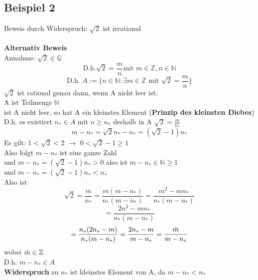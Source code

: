 \documentclass{article}
\begin{document}
        \subsection{Beispiel 2}
        Beweis durch Widerspruch: $\sqrt{2}$ ist irrational\\\\
        \textbf{Alternativ Beweis}\\
            Annahme: $\sqrt{2}\in \mathbb{Q}$\\
            $$\text{D.h.} \sqrt{2}=\frac{m}{n} \text{mit }m \in \mathbb{Z}, n\in \mathbb{N}$$
            $$\text{D.h. } A:= \{ n\in \mathbb{N} : \exists m \in \mathbb{Z} \text{ mit } \sqrt{2}=\frac{m}{n}\}$$
            $\sqrt{2}$ ist rational genau dann, wenn A  nicht leer ist.\\
            A ist Teilmenge $\mathbb{N}$\\
            ist A nicht leer, so hat A ein kleinstes Element (\textbf{Prinzip des kleinsten Diebes})\\
            D.h. es existiert $n_*\in A$ mit $n \ge n_*$ deshalb in A $\sqrt{2}=\frac{m}{n_*}$\\
            $$m-n_*=\sqrt{2}n_*-n_*=(\sqrt{2}-1)n_*$$
            Es gilt: $1<\sqrt{2}<2$ $\to$ $0<\sqrt{2}-1\ge 1$\\
            Also folgt $m-n_*$ ist eine ganze Zahl\\
            und $m-n_*=(\sqrt{2}-1)n_*>0$ also ist $m-n_* \in \mathbb{N} \ge 1$\\
            und $m-n_*=(\sqrt{2}-1)n_*< n_*$\\
            Also ist
            $$\sqrt{2}=\frac{m}{n_*} =
            \frac{m(m-n_*)}{n_*(m-n_*)}=
            \frac{m^2-mn_*}{n_*(m-n_*)}$$
            $$=\frac{2n^2-mn_*}{n_*(m-n_*)}$$
            $$=\frac{n_*(2n_*-m)}{n_*(m-n_*)}=
            \frac{2n_*-m}{m-n_*}=
            \frac{\Tilde{m}}{m-n_*}$$
            wobei $\Tilde{m} \in \mathbb{Z}$\\
            D.h. $m-n_* \in A$\\
            \textbf{Widerspruch} zu $n_*$ ist kleinstes Element von A, da $m-n_*<n_*$
\end{document}
